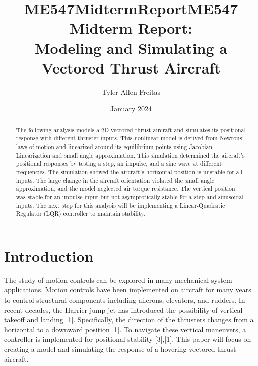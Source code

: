 \documentclass[conference]{IEEEtran}
\begin{document}
\title{ME547MidtermReport}
\author{Tyler Allen Freitas}
\date{January 2024}

\title{ME547 Midterm Report: \\ Modeling and Simulating a Vectored Thrust Aircraft}

\author{
}

\maketitle

\begin{abstract}
The following analysis models a 2D vectored thrust aircraft and simulates its positional response with different thruster inputs. This nonlinear model is derived from Newtons' laws of motion and linearized around its equilibrium points using Jacobian Linearization and small angle approximation. This simulation determined the aircraft's positional responses by testing a step, an impulse, and a sine wave at different frequencies. The simulation showed the aircraft's horizontal position is unstable for all inputs. The large change in the aircraft orientation violated the small angle approximation, and the model neglected air torque resistance. The vertical position was stable for an impulse input but not asymptotically stable for a step and sinusoidal inputs. The next step for this analysis will be implementing a Linear-Quadratic Regulator (LQR) controller to maintain stability.
\end{abstract}


\section{Introduction}
The study of motion controls can be explored in many mechanical system applications. Motion controls have been implemented on aircraft for many years to control structural components including ailerons, elevators, and rudders. In recent decades, the Harrier jump jet has introduced the possibility of vertical takeoff and landing [1]. Specifically, the direction of the thrusters changes from a horizontal to a downward position [1]. To navigate these vertical maneuvers, a controller is implemented for positional stability [3],[1]. This paper will focus on creating a model and simulating the response of a hovering vectored thrust aircraft.  
\end{document}
